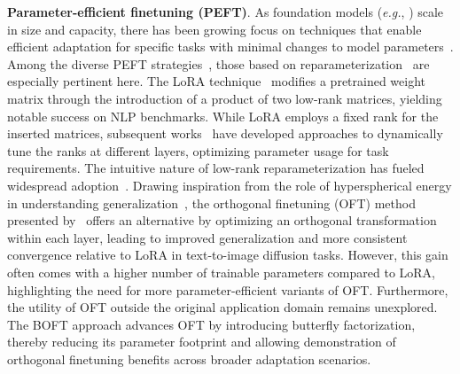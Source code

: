 \textbf{Parameter-efficient finetuning (PEFT)}. As foundation models (\emph{e.g.}, \cite{brown2020language,radford2021learning,rombach2022high,kirillov2023segment}) scale in size and capacity, there has been growing focus on techniques that enable efficient adaptation for specific tasks with minimal changes to model parameters~\cite{treviso2023efficient,ding2023parameter,lialin2023scaling}. Among the diverse PEFT strategies~\cite{houlsby2019parameter,aghajanyan2020intrinsic,hulora2022,edalati2022krona,wang2022adamix,gheini2021cross,zaken2022bitfit,guo2020parameter,sung2021training,ansell2022composable,lester2021power,li2021prefix,vu2022spot,he2021towards,mao2021unipelt,karimi2021compacter,liu2022few,sung2022lst,chen2022parameter,jia2022visual,chen2022adaptformer,zhang2022neural,jie2023fact,lian2022scaling,luo2023towards}, those based on reparameterization~\cite{aghajanyan2020intrinsic,hulora2022,edalati2022krona} are especially pertinent here. The LoRA technique~\cite{hulora2022} modifies a pretrained weight matrix through the introduction of a product of two low-rank matrices, yielding notable success on NLP benchmarks. While LoRA employs a fixed rank for the inserted matrices, subsequent works~\cite{zhang2022adaptive,valipour2022dylora,zhang2023increlora} have developed approaches to dynamically tune the ranks at different layers, optimizing parameter usage for task requirements. The intuitive nature of low-rank reparameterization has fueled widespread adoption~\cite{dettmers2023qlora,zi2023delta,chavan2023one}. Drawing inspiration from the role of hyperspherical energy in understanding generalization~\cite{liu2018learning,liu2021orthogonal}, the orthogonal finetuning (OFT) method presented by~\cite{qiu2023controlling} offers an alternative by optimizing an orthogonal transformation within each layer, leading to improved generalization and more consistent convergence relative to LoRA in text-to-image diffusion tasks. However, this gain often comes with a higher number of trainable parameters compared to LoRA, highlighting the need for more parameter-efficient variants of OFT. Furthermore, the utility of OFT outside the original application domain remains unexplored. The BOFT approach advances OFT by introducing butterfly factorization, thereby reducing its parameter footprint and allowing demonstration of orthogonal finetuning benefits across broader adaptation scenarios.

